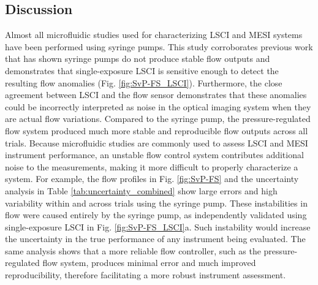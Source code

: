 \documentclass[12pt]{spieman}
\begin{document}
\begin{spacing}{2}
\section{Discussion}
\label{sect:discussion}

Almost all microfluidic studies used for characterizing LSCI and MESI systems have been performed using syringe pumps. This study corroborates previous work \cite{Li:2014ca,Zhou:2011ey,Zeng.2020} that has shown syringe pumps do not produce stable flow outputs and demonstrates that single-exposure LSCI is sensitive enough to detect the resulting flow anomalies (Fig. \ref{fig:SvP-FS_LSCI}). Furthermore, the close agreement between LSCI and the flow sensor demonstrates that these anomalies could be incorrectly interpreted as noise in the optical imaging system when they are actual flow variations. Compared to the syringe pump, the pressure-regulated flow system produced much more stable and reproducible flow outputs across all trials. Because microfluidic studies are commonly used to assess LSCI and MESI instrument performance, an unstable flow control system contributes additional noise to the measurements, making it more difficult to properly characterize a system. For example, the flow profiles in Fig. \ref{fig:SvP-FS} and the uncertainty analysis in Table \ref{tab:uncertainty_combined} show large errors and high variability within and across trials using the syringe pump. These instabilities in flow were caused entirely by the syringe pump, as independently validated using single-exposure LSCI in Fig. \ref{fig:SvP-FS_LSCI}a. Such instability would increase the uncertainty in the true performance of any instrument being evaluated. The same analysis shows that a more reliable flow controller, such as the pressure-regulated flow system, produces minimal error and much improved reproducibility, therefore facilitating a more robust instrument assessment. 


\end{spacing}
\end{document}
